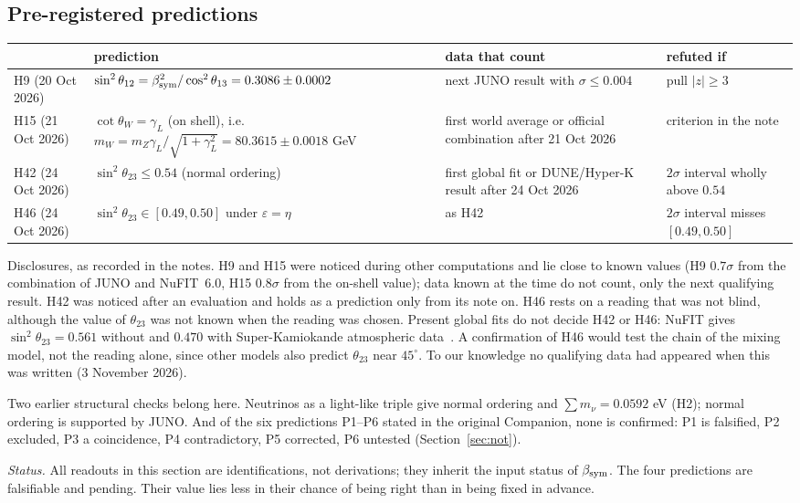 \subsection{Pre-registered predictions}

\begin{center}
\small
\renewcommand{\arraystretch}{1.3}
\begin{tabular}{@{}>{\raggedright\arraybackslash}p{}>{\raggedright\arraybackslash}p{}>{\raggedright\arraybackslash}p{}>{\raggedright\arraybackslash}p{}@{}}
\toprule
& prediction & data that count & refuted if\\
\midrule
H9 (20 Oct 2026) & \(\sin^2\theta_{12}=\beta_{\rm sym}^2/\cos^2\theta_{13}=0.3086\pm0.0002\) & next JUNO result with \(\sigma\le0.004\) & pull \(|z|\ge3\)\\
H15 (21 Oct 2026) & \(\cot\theta_W=\gamma_L\) (on shell), i.e.\ \(m_W=m_Z\gamma_L/\sqrt{1+\gamma_L^2}=80.3615\pm0.0018\) GeV & first world average or official combination after 21 Oct 2026 & criterion in the note\\
H42 (24 Oct 2026) & \(\sin^2\theta_{23}\le0.54\) (normal ordering) & first global fit or DUNE/Hyper-K result after 24 Oct 2026 & \(2\sigma\) interval wholly above \(0.54\)\\
H46 (24 Oct 2026) & \(\sin^2\theta_{23}\in[0.49,0.50]\) under \(\varepsilon=\eta\) & as H42 & \(2\sigma\) interval misses \([0.49,0.50]\)\\
\bottomrule
\end{tabular}
\end{center}

Disclosures, as recorded in the notes.  H9 and H15 were noticed during other computations and lie close to known values (H9 \(0.7\sigma\)
from the combination of JUNO and NuFIT~6.0, H15 \(0.8\sigma\) from the on-shell value); data known at the time do not count, only the next
qualifying result.  H42 was noticed after an evaluation and holds as a prediction only from its note on.  H46 rests on a reading that was
not blind, although the value of \(\theta_{23}\) was not known when the reading was chosen.  Present global fits do not decide H42 or
H46: NuFIT gives \(\sin^2\theta_{23}=0.561\) without and \(0.470\) with Super-Kamiokande atmospheric data~\cite{nufit}.  A confirmation of
H46 would test the chain of the mixing model, not the reading alone, since other models also predict \(\theta_{23}\) near \(45^\circ\).
To our knowledge no qualifying data had appeared when this was written (3 November 2026).

Two earlier structural checks belong here.  Neutrinos as a light-like triple give normal ordering and \(\sum m_\nu=0.0592\) eV (H2); normal
ordering is supported by JUNO.  And of the six predictions P1--P6 stated in the original Companion, none is confirmed: P1 is falsified, P2
excluded, P3 a coincidence, P4 contradictory, P5 corrected, P6 untested (Section~\ref{sec:not}).

\medskip\noindent\emph{Status.}  All readouts in this section are identifications, not derivations; they inherit the input status of
\(\beta_{\rm sym}\).  The four predictions are falsifiable and pending.  Their value lies less in their chance of being right than in being
fixed in advance.
